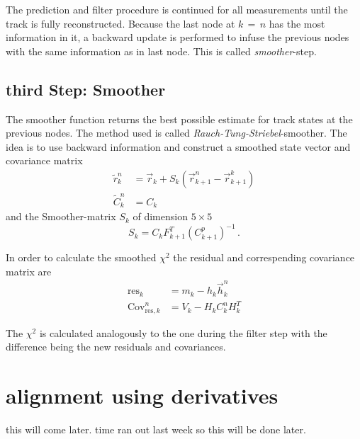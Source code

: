 The prediction and filter procedure is continued for all measurements until the track is fully reconstructed.
Because the last node at $k \, = \, n$ has the most information in it, a backward update is performed to infuse the previous nodes with the same information as in last node.
This is called \textit{smoother}-step.

\subsection{third Step: Smoother}
The smoother function returns the best possible estimate for track states at
the previous nodes. The method used is called \textit{Rauch-Tung-Striebel}-smoother\cite{RTS}.
The idea is to use backward information and construct a smoothed state vector and covariance matrix
\begin{align*}
  \tilde{r}_k^n &= \vec{r}_k + S_k \left( \vec{r}_{k+1}^n - \vec{r}_{k+1}^k \right) \\
  \tilde{C}_k^n &= C_k
\end{align*}
and the Smoother-matrix $S_k$ of dimension $5\times5$
\begin{equation*}
  S_k = C_k F_{k+1}^T \left( C_{k+1}^p \right)^{-1}\,.
\end{equation*}

In order to calculate the smoothed $\chi^2$ the residual and correspending covariance matrix are
\begin{align*}
  \text{res}_k &= m_k - h_k \vec{h}_k^n \\
  \text{Cov}_{\text{res},k}^n &= V_k - H_k C_k^n H_k^T
\end{align*}

The $\chi^2$ is calculated analogously to the one during the filter step with the difference being the new residuals and covariances.

\section{alignment using derivatives}
\label{sec:derivatives}

this will come later. time ran out last week so this will be done later.


%
%
%
%

